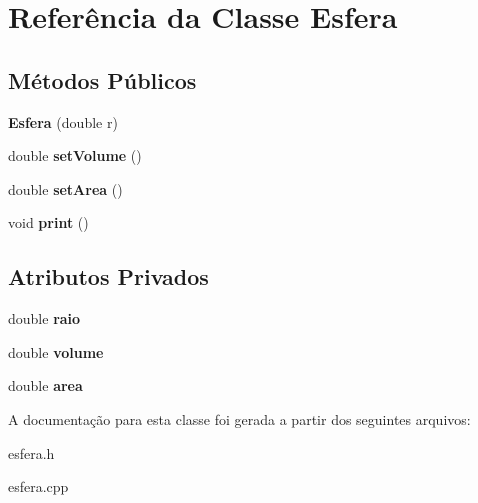 \hypertarget{classEsfera}{}\section{Referência da Classe Esfera}
\label{classEsfera}
\subsection*{Métodos Públicos}
\begin{DoxyCompactItemize}
\item 
{\bfseries Esfera} (double r)\hypertarget{classEsfera_a3f8379bd4e626ca0f5926130ddf3f2f9}{}\label{classEsfera_a3f8379bd4e626ca0f5926130ddf3f2f9}

\item 
double {\bfseries set\+Volume} ()\hypertarget{classEsfera_a6acae24012d8e3be210c616fc7669e76}{}\label{classEsfera_a6acae24012d8e3be210c616fc7669e76}

\item 
double {\bfseries set\+Area} ()\hypertarget{classEsfera_a3e0fd725465aabab560e5632ec67091d}{}\label{classEsfera_a3e0fd725465aabab560e5632ec67091d}

\item 
void {\bfseries print} ()\hypertarget{classEsfera_ac710d84f9715e2aec45dd6e7e88252b2}{}\label{classEsfera_ac710d84f9715e2aec45dd6e7e88252b2}

\end{DoxyCompactItemize}
\subsection*{Atributos Privados}
\begin{DoxyCompactItemize}
\item 
double {\bfseries raio}\hypertarget{classEsfera_ac4e0f2f21172972498ea90e7d7eadef8}{}\label{classEsfera_ac4e0f2f21172972498ea90e7d7eadef8}

\item 
double {\bfseries volume}\hypertarget{classEsfera_af1671f47044a51de4e4dd619210dc4c2}{}\label{classEsfera_af1671f47044a51de4e4dd619210dc4c2}

\item 
double {\bfseries area}\hypertarget{classEsfera_a7cef6ce52aa10989132d1d7207868a6a}{}\label{classEsfera_a7cef6ce52aa10989132d1d7207868a6a}

\end{DoxyCompactItemize}


A documentação para esta classe foi gerada a partir dos seguintes arquivos\+:\begin{DoxyCompactItemize}
\item 
esfera.\+h\item 
esfera.\+cpp\end{DoxyCompactItemize}
